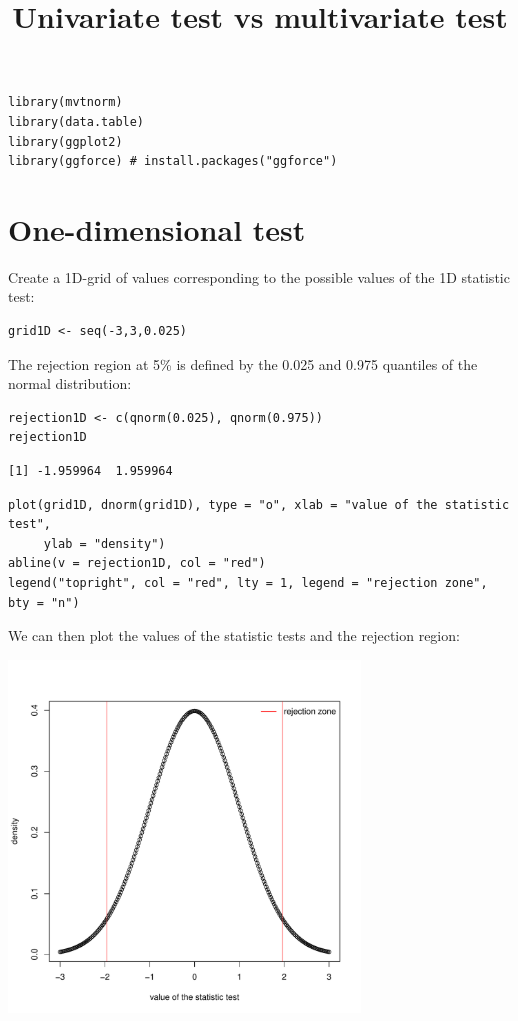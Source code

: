 \documentclass{article}
\date{}
\title{Univariate test vs multivariate test}
\begin{document}
\maketitle
\lstset{language=r,label= ,caption= ,captionpos=b,numbers=none}
\begin{lstlisting}
library(mvtnorm)
library(data.table)
library(ggplot2)
library(ggforce) # install.packages("ggforce")
\end{lstlisting}

\section{One-dimensional test}
\label{sec:orgab822a9}

Create a 1D-grid of values corresponding to the possible values of the 1D statistic test:
\lstset{language=r,label= ,caption= ,captionpos=b,numbers=none}
\begin{lstlisting}
grid1D <- seq(-3,3,0.025)
\end{lstlisting}

The rejection region at 5\% is defined by the 0.025 and 0.975 quantiles of the normal distribution:
\lstset{language=r,label= ,caption= ,captionpos=b,numbers=none}
\begin{lstlisting}
rejection1D <- c(qnorm(0.025), qnorm(0.975))
rejection1D
\end{lstlisting}

\begin{verbatim}
[1] -1.959964  1.959964
\end{verbatim}

\lstset{language=r,label= ,caption= ,captionpos=b,numbers=none}
\begin{lstlisting}
plot(grid1D, dnorm(grid1D), type = "o", xlab = "value of the statistic test", 
	 ylab = "density")
abline(v = rejection1D, col = "red")
legend("topright", col = "red", lty = 1, legend = "rejection zone", bty = "n")
\end{lstlisting}

We can then plot the values of the statistic tests and the rejection region:
\begin{center}
\includegraphics[width=0.7\textwidth]{figures/1D-test.pdf}
\end{center}
\end{document}

